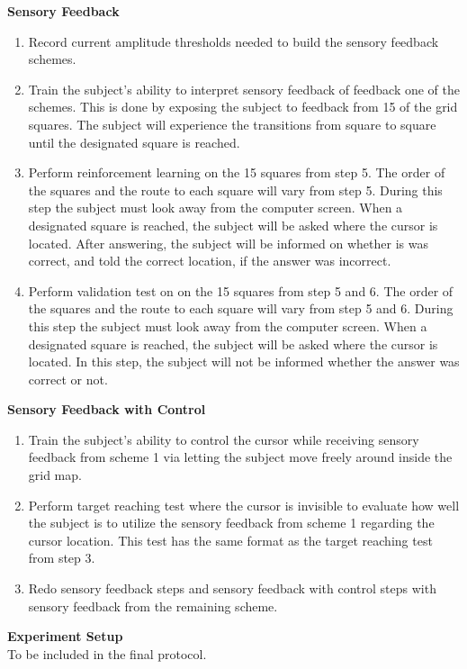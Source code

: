 \textbf{Sensory Feedback} \\
\begin{enumerate}
	\item Record current amplitude thresholds needed to build the sensory feedback schemes.
	\item Train the subject's ability to interpret sensory feedback of feedback one of the schemes. This is done  by exposing the subject to feedback from 15 of the grid squares. The subject will experience the transitions from square to square until the designated square is reached.  
	\item Perform reinforcement learning on the 15 squares from step 5. The order of the squares and the route to each square will vary from step 5. During this step the subject must look away from the computer screen. When a designated square is reached, the subject will be asked where the cursor is located. After answering, the subject will be informed on whether is was correct, and told the correct location, if the answer was incorrect. 
	\item Perform validation test on on the 15 squares from step 5 and 6. The order of the squares and the route to each square will vary from step 5 and 6. During this step the subject must look away from the computer screen. When a designated square is reached, the subject will be asked where the cursor is located. In this step, the subject will not be informed whether the answer was correct or not.
\end{enumerate}

\textbf{Sensory Feedback with Control} \\
\begin{enumerate}
	\item Train the subject's ability to control the cursor while receiving sensory feedback from scheme 1 via letting the subject move freely around inside the grid map.
	\item Perform target reaching test where the cursor is invisible to evaluate how well the subject is to utilize the sensory feedback from scheme 1 regarding the cursor location. This test has the same format as the target reaching test from step 3.
	\item Redo sensory feedback steps and sensory feedback with control steps with sensory feedback from the remaining scheme.
\end{enumerate}

\textbf{{\Large Experiment Setup}} \\
To be included in the final protocol.

